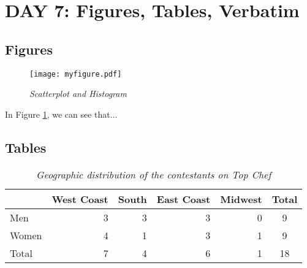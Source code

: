 \documentclass[10pt]{article}
\begin{document}
\section*{DAY 7: Figures, Tables, Verbatim}

\subsection*{Figures}

\begin{figure}[!htp]
\begin{center}
\texttt{[image: myfigure.pdf]}
\caption{\textit{Scatterplot and Histogram}}
\label{MyFigure}
\end{center}
\end{figure}

In Figure \ref{MyFigure}, we can see that...

\subsection*{Tables}
\begin{table}[!htp]
\begin{center}
\begin{tabular}{l|rrrr||c}
  & West Coast & South & East Coast & Midwest & Total\\
\hline
  Men & 3 & 3 & 3 & 0 & 9 \\
  Women & 4 & 1 & 3 & 1 & 9 \\
\hline
  Total & 7 & 4 & 6 & 1 & 18 \\
\end{tabular}
\end{center}
\caption{\textit{Geographic distribution of the contestants on Top Chef}}
\label{TopChef}
\end{table}
\end{document}
